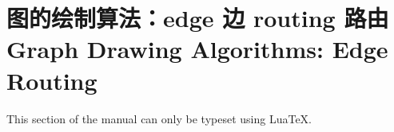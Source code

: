 %
%
%


\section{图的绘制算法：edge 边 routing 路由 Graph Drawing Algorithms: Edge Routing}
\label{section-last-graphdrawing-library-in-manual}

{}

\label{section-gd-edge-routing}

\ifluatex
\else
    This section of the manual can only be typeset using Lua\TeX.
    \expandafter\endinput
\fi


\includeluadocumentationof{pgf.gd.routing.library}
\includeluadocumentationof{pgf.gd.routing.NecklaceRouting}


